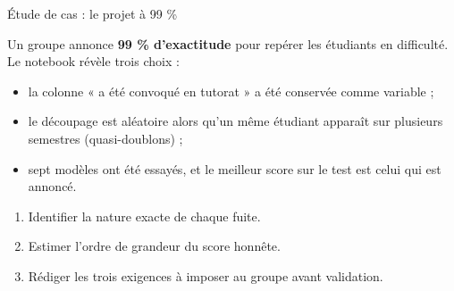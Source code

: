 \begin{frame}{Étude de cas : le projet à 99 \%}
\begin{wbox}[La situation]
Un groupe annonce \textbf{99 \% d'exactitude} pour repérer les étudiants en
difficulté. Le notebook révèle trois choix :
\begin{itemize}
  \item la colonne « a été convoqué en tutorat » a été conservée comme variable ;
  \item le découpage est aléatoire alors qu'un même étudiant apparaît sur
        plusieurs semestres (quasi-doublons) ;
  \item sept modèles ont été essayés, et le meilleur score sur le test est
        celui qui est annoncé.
\end{itemize}
\end{wbox}
\vspace{1mm}
\begin{abox}
\begin{enumerate}
  \item Identifier la nature exacte de chaque fuite.
  \item Estimer l'ordre de grandeur du score honnête.
  \item Rédiger les trois exigences à imposer au groupe avant validation.
\end{enumerate}
\end{abox}
\end{frame}


